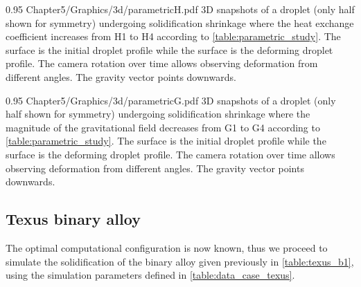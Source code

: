 \begin{figureth}
{0.95}
{Chapter5/Graphics/3d/parametricH.pdf}
{3D snapshots of a droplet (only half shown for symmetry) undergoing solidification shrinkage where the heat exchange coefficient 
increases from H1 to H4 according to \cref{table:parametric_study}. The  surface is the initial droplet profile while the  surface
is the deforming droplet profile. The camera rotation over time allows observing deformation from different angles. The gravity vector points downwards.}
\label{fig:parametricH}
\end{figureth}

\begin{figureth}
{0.95}
{Chapter5/Graphics/3d/parametricG.pdf}
{3D snapshots of a droplet (only half shown for symmetry) undergoing solidification shrinkage where the magnitude of the gravitational field
decreases from G1 to G4 according to \cref{table:parametric_study}. The  surface is the initial droplet profile while the  surface
is the deforming droplet profile. The camera rotation over time allows observing deformation from different angles.
The gravity vector points downwards.}
\label{fig:parametricG}
\end{figureth}


\subsection{Texus binary alloy}

The optimal computational configuration is now known, thus we proceed to simulate the solidification of the binary alloy given previously in \cref{table:texus_b1}, using
the simulation parameters defined in \cref{table:data_case_texus}.


